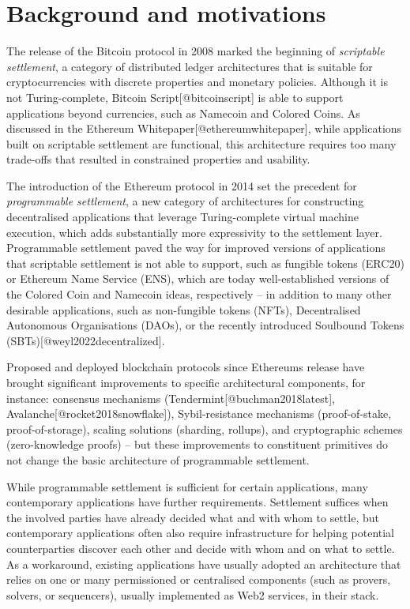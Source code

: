 
\section{Background and motivations}\label{background-and-motivations}

The release of the Bitcoin protocol in 2008 marked the beginning of
\emph{scriptable settlement}, a category of distributed ledger
architectures that is suitable for cryptocurrencies with discrete
properties and monetary policies. Although it is not Turing-complete,
Bitcoin Script{[}@bitcoinscript{]} is able to support applications
beyond currencies, such as Namecoin and Colored Coins. As discussed in
the Ethereum Whitepaper{[}@ethereumwhitepaper{]}, while applications
built on scriptable settlement are functional, this architecture
requires too many trade-offs that resulted in constrained properties and
usability.

The introduction of the Ethereum protocol in 2014 set the precedent for
\emph{programmable settlement}, a new category of architectures for
constructing decentralised applications that leverage Turing-complete
virtual machine execution, which adds substantially more expressivity to
the settlement layer. Programmable settlement paved the way for improved
versions of applications that scriptable settlement is not able to
support, such as fungible tokens (ERC20) or Ethereum Name Service (ENS),
which are today well-established versions of the Colored Coin and
Namecoin ideas, respectively -- in addition to many other desirable
applications, such as non-fungible tokens (NFTs), Decentralised
Autonomous Organisations (DAOs), or the recently introduced Soulbound
Tokens (SBTs){[}@weyl2022decentralized{]}.

Proposed and deployed blockchain protocols since
Ethereum\textquotesingle s release have brought significant improvements
to specific architectural components, for instance: consensus mechanisms
(Tendermint{[}@buchman2018latest{]},
Avalanche{[}@rocket2018snowflake{]}), Sybil-resistance mechanisms
(proof-of-stake, proof-of-storage), scaling solutions (sharding,
rollups), and cryptographic schemes (zero-knowledge proofs) -- but these
improvements to constituent primitives do not change the basic
architecture of programmable settlement.

While programmable settlement is sufficient for certain applications,
many contemporary applications have further requirements. Settlement
suffices when the involved parties have already decided what and with
whom to settle, but contemporary applications often also require
infrastructure for helping potential counterparties discover each other
and decide with whom and on what to settle. As a workaround, existing
applications have usually adopted an architecture that relies on one or
many permissioned or centralised components (such as provers, solvers,
or sequencers), usually implemented as Web2 services, in their stack.

